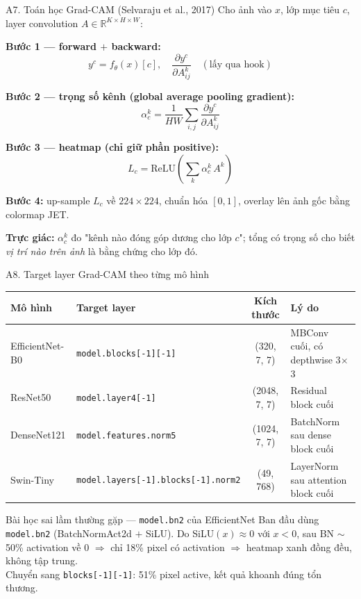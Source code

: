 \documentclass[10pt, aspectratio=169]{beamer}
\begin{document}
\begin{frame}{A7. Toán học Grad-CAM (Selvaraju et al., 2017)}
    \footnotesize
    Cho ảnh vào $x$, lớp mục tiêu $c$, layer convolution $A \in \mathbb{R}^{K \times H \times W}$:

    \textbf{Bước 1 --- forward $+$ backward:}
    \[
        y^c = f_\theta(x)[c], \quad
        \frac{\partial y^c}{\partial A^k_{ij}} \quad (\text{lấy qua hook})
    \]

    \textbf{Bước 2 --- trọng số kênh (global average pooling gradient):}
    \[
        \alpha_c^k = \frac{1}{HW} \sum_{i,j} \frac{\partial y^c}{\partial A^k_{ij}}
    \]

    \textbf{Bước 3 --- heatmap (chỉ giữ phần positive):}
    \[
        L_c = \mathrm{ReLU}\!\left( \sum_k \alpha_c^k \, A^k \right)
    \]

    \textbf{Bước 4:} up-sample $L_c$ về $224\times 224$, chuẩn hóa $[0,1]$, overlay lên ảnh gốc bằng colormap JET.

    \vspace{0.2cm}
    \textbf{Trực giác:} $\alpha_c^k$ đo "kênh nào đóng góp dương cho lớp $c$"; tổng có trọng số cho biết \textit{vị trí nào trên ảnh} là bằng chứng cho lớp đó.
\end{frame}

\begin{frame}{A8. Target layer Grad-CAM theo từng mô hình}
    \scriptsize
    \begin{table}[]
        \centering
        \begin{tabular}{llcl}
        \toprule
        \rowcolor{usthblue!25} \textbf{Mô hình} & \textbf{Target layer} & \textbf{Kích thước} & \textbf{Lý do} \\
        \midrule
        EfficientNet-B0 & \texttt{model.blocks[-1][-1]}         & (320, 7, 7) & MBConv cuối, có depthwise 3$\times$3 \\
        ResNet50        & \texttt{model.layer4[-1]}             & (2048, 7, 7) & Residual block cuối \\
        DenseNet121     & \texttt{model.features.norm5}         & (1024, 7, 7) & BatchNorm sau dense block cuối \\
        Swin-Tiny       & \texttt{model.layers[-1].blocks[-1].norm2} & (49, 768) & LayerNorm sau attention block cuối \\
        \bottomrule
        \end{tabular}
    \end{table}

    \vspace{0.3cm}
    \begin{block}{Bài học sai lầm thường gặp --- \texttt{model.bn2} của EfficientNet}
        \footnotesize
        Ban đầu dùng \texttt{model.bn2} (BatchNormAct2d $+$ SiLU). Do SiLU$(x) \approx 0$ với $x < 0$, sau BN $\sim$\,50\% activation về 0 $\Rightarrow$ chỉ 18\% pixel có activation $\Rightarrow$ heatmap xanh đồng đều, không tập trung.\\
        Chuyển sang \texttt{blocks[-1][-1]}: 51\% pixel active, kết quả khoanh đúng tổn thương.
    \end{block}
\end{frame}
\end{document}
